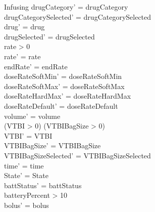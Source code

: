 \begin{schema}{Infusing}
	drugCategory' = drugCategory\\ drugCategorySelected' = drugCategorySelected\\
	drug' = drug\\ drugSelected' = drugSelected\\
	rate > 0\\
	rate' = rate\\
	endRate' = endRate\\
	doseRateSoftMin' = doseRateSoftMin\\
	doseRateSoftMax' = doseRateSoftMax\\
	doseRateHardMax' = doseRateHardMax\\
	doseRateDefault' = doseRateDefault\\
	volume' = volume\\
	(VTBI > 0) \lor (VTBIBagSize > 0)\\
	VTBI' = VTBI\\
	VTBIBagSize' = VTBIBagSize\\ VTBIBagSizeSelected' = VTBIBagSizeSelected\\
	time' = time\\ State' = State\\
	battStatus' = battStatus\\
	batteryPercent > 10\\
	bolus' = bolus\\

\end{schema}
